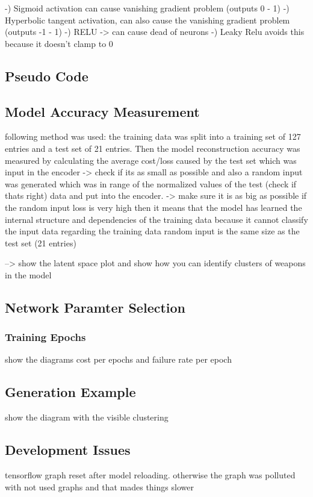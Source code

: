 \documentclass[MGS,Master,english]{twbook}%
\begin{document}
-) Sigmoid activation can cause vanishing gradient problem (outputs 0 - 1)
-) Hyperbolic tangent activation, can also cause the vanishing gradient problem (outputs -1 - 1)
-) RELU -> can cause dead of neurons
-) Leaky Relu avoids this because it doesn't clamp to 0

\subsection{Pseudo Code}

\subsection{Model Accuracy Measurement}
following method was used: 
the training data was split into a training set of 127 entries and a test set of 21 entries. 
Then the model reconstruction accuracy was measured by calculating the average cost/loss caused by the test set which was input in the encoder -> check if its as small as possible
and also a random input was generated which was in range of the normalized values of the test (check if thats right) data and put into the encoder. -> make sure it is as big as possible
if the random input loss is very high then it means that the model has learned the internal structure and dependencies of the training data because it cannot classify the input data regarding the training data
random input is the same size as the test set (21 entries)

--> show the latent space plot and show how you can identify clusters of weapons in the model


\subsection{Network Paramter Selection}
\subsubsection{Training Epochs}
show the diagrams cost per epochs and failure rate per epoch

\subsection{Generation Example}
show the diagram with the visible clustering 


\subsection{Development Issues}
tensorflow graph reset after model reloading. otherwise the graph was polluted with not used graphs and that mades things slower
\end{document}
